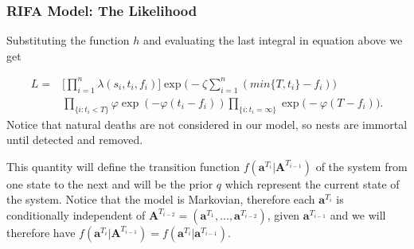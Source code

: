 \documentclass[9pt, xcolor={dvipsnames,svgnames,table}]{beamer}
\begin{document}
\begin{frame}
\frametitle{RIFA Model: The Likelihood}
    Substituting the function $h$ and evaluating the last integral in equation above we get

    \begin{equation*}
        \begin{aligned}
            L = & \Bigg[ \prod_{i = 1}^{n} \lambda(s_{i}, t_{i}, f_{i}) \Bigg] \exp \bigg(- \zeta \sum_{i=1}^{n} (min\{ T, t_i \} - f_i) \bigg) \\ 
            & \prod_{\{ i : t_{i} < T \} } \varphi \exp (- \varphi (t_{i} - f_{i})) \prod_{ \{ i : t_{i} = \infty \} } \exp \bigg( - \varphi(T - f_{i}) \bigg).
        \end{aligned}
    \end{equation*}
    Notice that natural deaths are not considered in our model, so nests are immortal until detected and removed.
    
    This quantity will define the transition function $f(\bm{a}^{T_i} | \bm{A}^{T_{i-1}})$ of the system from one state to the next and will be the prior $q$ which represent the current state of the system. Notice that the model is Markovian, therefore each $\bm{a}^{T_i}$ is conditionally independent of $\bm{A}^{T_{i-2}} = (\bm{a}^{T_1}, \dots, \bm{a}^{T_{i-2}})$, given $\bm{a}^{T_{i-1}}$ and we will therefore have $f(\bm{a}^{T_i} | \bm{A}^{T_{i-1}}) = f(\bm{a}^{T_i} | \bm{a}^{T_{i-1}})$. 
\end{frame}
\end{document}
